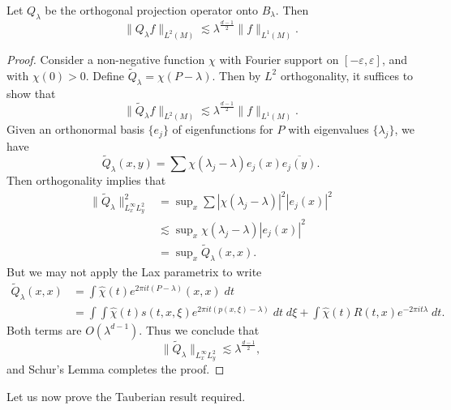 \begin{lemma}
    Let $Q_\lambda$ be the orthogonal projection operator onto $B_\lambda$. Then
    \[ \| Q_\lambda f \|_{L^2(M)} \lesssim \lambda^{\frac{d-1}{2}} \| f \|_{L^1(M)}. \]
\end{lemma} 
\begin{proof}
    Consider a non-negative function $\chi$ with Fourier support on $[-\varepsilon,\varepsilon]$, and with $\chi(0) > 0$. Define $\tilde{Q}_\lambda = \chi(P - \lambda)$. Then by $L^2$ orthogonality, it suffices to show that
    \[ \| \tilde{Q}_\lambda f \|_{L^2(M)} \lesssim \lambda^{\frac{d-1}{2}} \| f \|_{L^1(M)}. \]
    Given an orthonormal basis $\{ e_j \}$ of eigenfunctions for $P$ with eigenvalues $\{ \lambda_j \}$, we have
    \[ \tilde{Q}_\lambda(x,y) = \sum \chi( \lambda_j - \lambda ) e_j(x) \overline{e_j(y)}. \]
    Then orthogonality implies that
    \begin{align*}
        \| \tilde{Q}_\lambda \|_{L^\infty_x L^2_y}^2 &= \sup\nolimits_x \sum |\chi(\lambda_j - \lambda)|^2 |e_j(x)|^2\\
        &\lesssim \sup\nolimits_x \chi(\lambda_j - \lambda) |e_j(x)|^2\\
        &= \sup\nolimits_x \tilde{Q}_\lambda(x,x).
    \end{align*}
    But we may not apply the Lax parametrix to write
    \begin{align*}
        \tilde{Q}_\lambda(x,x) &= \int \widehat{\chi}(t) e^{2 \pi i t (P - \lambda)}(x,x)\; dt\\
        &= \int \int \widehat{\chi}(t) s(t,x,\xi) e^{2 \pi i t ( p(x,\xi) - \lambda )}\; dt\; d\xi + \int \widehat{\chi}(t) R(t,x) e^{-2 \pi i t \lambda}\; dt.
    \end{align*}
    Both terms are $O(\lambda^{d-1})$. Thus we conclude that
    \[ \| \tilde{Q}_\lambda \|_{L^\infty_x L^2_y} \lesssim \lambda^{\frac{d-1}{2}}, \]
    and Schur's Lemma completes the proof.
\end{proof}

Let us now prove the Tauberian result required.

